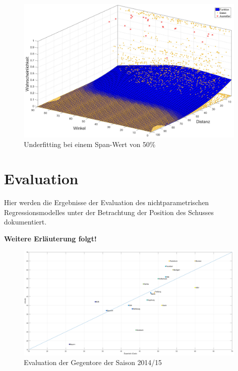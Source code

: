 \begin{figure}[H]
\centering
\includegraphics[scale=0.34]{se-wa-jpg/splinewdTL}
\caption{Underfitting bei einem Span-Wert von 50\%}
\label{splinewdTL}
\end{figure}

\chapter{Evaluation}
\label{anheva}

Hier werden die Ergebnisse der Evaluation des nichtparametrischen Regressionsmodelles unter der Betrachtung der Position des Schusses dokumentiert. 

\textbf{Weitere Erläuterung folgt!}


\begin{figure}
\centering
\includegraphics[scale=0.3]{se-wa-jpg/cGoals_correlation_14_15}
\caption{Evaluation der Gegentore der Saison 2014/15}
\label{cg1415}
\end{figure}

